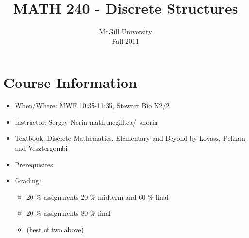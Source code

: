 \documentclass[9pt, letterpaper, oneside]{article}
\title{MATH 240 - Discrete Structures}
\author{McGill University \\ Fall 2011}
\date{}
\begin{document}

\maketitle
\tableofcontents
{}


\section*{Course Information}

\begin{itemize}
\item When/Where: MWF 10:35-11:35, Stewart Bio N2/2
\item Instructor: Sergey Norin math.mcgill.ca/~snorin
\item Textbook: Discrete Mathematics, Elementary and Beyond by Lovasz, Pelikan and Vesztergombi
\item Prerequisites: 
\item Grading:
	\begin{itemize}
		\item 20 \% assignments 20 \% midterm and 60 \% final
		\item 20 \% assignments 80 \% final
		\item (best of two above)
	\end{itemize}
\end{itemize}
\end{document}
